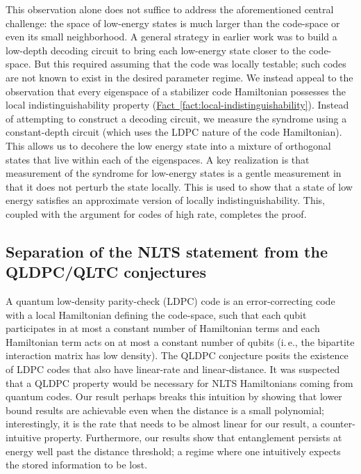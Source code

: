 \documentclass[11pt]{article}
\newcommand{\expref}[2]{\texorpdfstring{\hyperref[#2]{#1~\ref{#2}}}{#1~\ref{#2}}}
\newcommand{\ie}{i.\,e.}
\begin{document}
This observation alone does not suffice to address the aforementioned central challenge: the space of low-energy states is much larger than the code-space or even its small neighborhood. A general strategy in earlier %
work   %
\cite{8104078,Eldar2019RobustQE} was to build a low-depth decoding circuit
%
to bring each low-energy state closer to the code-space. But this required assuming that the code was locally testable; such codes are not known to exist in the desired parameter regime. We instead appeal to the observation that every eigenspace of a stabilizer code Hamiltonian possesses the local indistinguishability property (\expref{Fact}{fact:local-indistinguishability}). Instead of attempting to construct a decoding circuit, we measure the syndrome using a constant-depth circuit (which uses the LDPC nature of the code Hamiltonian). This allows us to decohere the low energy state into a mixture of orthogonal states that live within each of the eigenspaces. A key realization is that measurement of the syndrome for low-energy states is a gentle measurement in that it does not perturb the state locally. This is used to show that a state of low energy satisfies an approximate version of locally indistinguishability. This, coupled with the argument for codes of high rate, completes the proof.


\subsection{Separation of the NLTS statement from the QLDPC/QLTC conjectures}
A quantum low-density parity-check (LDPC) code is an error-correcting code with a local Hamiltonian defining the code-space, such that each qubit participates in at most a constant number of Hamiltonian terms and each Hamiltonian term acts on at most a constant number of qubits (\ie, the bipartite interaction matrix has
%
low density).  %
The QLDPC conjecture posits the existence of LDPC codes that also have linear-rate and linear-distance. It was suspected that a QLDPC property would be necessary for NLTS Hamiltonians \cite{10.5555/2600498.2600507,doi:10.1137/140975498,hastings17,8104078,nirkhe_et_al:LIPIcs:2018:9095} coming from quantum codes. Our result perhaps breaks this intuition by showing that lower bound results are achievable even when the distance is a small polynomial; interestingly, it is the rate that needs to be almost linear for our result, a counter-intuitive property. Furthermore, our results show that entanglement persists at energy well past the distance threshold; 
a regime where one intuitively expects the stored information to be lost.
\end{document}
